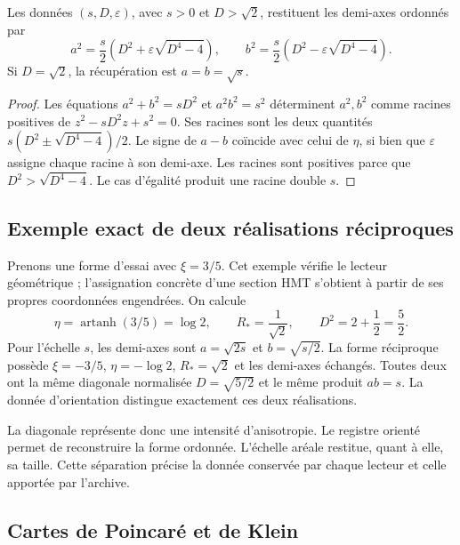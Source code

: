 \begin{corollary}
\label{hrr:semiejes-recuperacion} Les données \((s,D,\varepsilon)\), avec \(s>0\) et \(D>\sqrt2\), restituent les demi-axes ordonnés par
\begin{equation}
 a^2=\frac{s}{2}\left(D^2+\varepsilon\sqrt{D^4-4}\right),
 \qquad
 b^2=\frac{s}{2}\left(D^2-\varepsilon\sqrt{D^4-4}\right).
 \label{hrr:semiejes-radicales}
\end{equation}
Si \(D=\sqrt2\), la récupération est \(a=b=\sqrt{s}\).
\end{corollary}
\begin{proof}
Les équations \(a^2+b^2=sD^2\) et \(a^2b^2=s^2\) déterminent \(a^2,b^2\) comme racines positives de \(z^2-sD^2z+s^2=0\). Ses racines sont les deux quantités \(s(D^2\pm\sqrt{D^4-4})/2\). Le signe de \(a-b\) coïncide avec celui de \(\eta\), si bien que \(\varepsilon\) assigne chaque racine à son demi-axe. Les racines sont positives parce que \(D^2>\sqrt{D^4-4}\). Le cas d’égalité produit une racine double \(s\).
\end{proof}

\subsection{Exemple exact de deux réalisations réciproques}

Prenons une forme d’essai avec \(\xi=3/5\). Cet exemple vérifie le lecteur géométrique ; l’assignation concrète d’une section HMT s’obtient à partir de ses propres coordonnées engendrées. On calcule
\[
 \eta=\operatorname{artanh}(3/5)=\log2,\qquad
 R_*=\frac1{\sqrt2},\qquad
 D^2=2+\frac12=\frac52.
\]
Pour l’échelle \(s\), les demi-axes sont \(a=\sqrt{2s}\) et \(b=\sqrt{s/2}\). La forme réciproque possède \(\xi=-3/5\), \(\eta=-\log2\), \(R_*=\sqrt2\) et les demi-axes échangés. Toutes deux ont la même diagonale normalisée \(D=\sqrt{5/2}\) et le même produit \(ab=s\). La donnée d’orientation distingue exactement ces deux réalisations.

La diagonale représente donc une intensité d’anisotropie. Le registre orienté permet de reconstruire la forme ordonnée. L’échelle aréale restitue, quant à elle, sa taille. Cette séparation précise la donnée conservée par chaque lecteur et celle apportée par l’archive.

\subsection{Cartes de Poincaré et de Klein}

